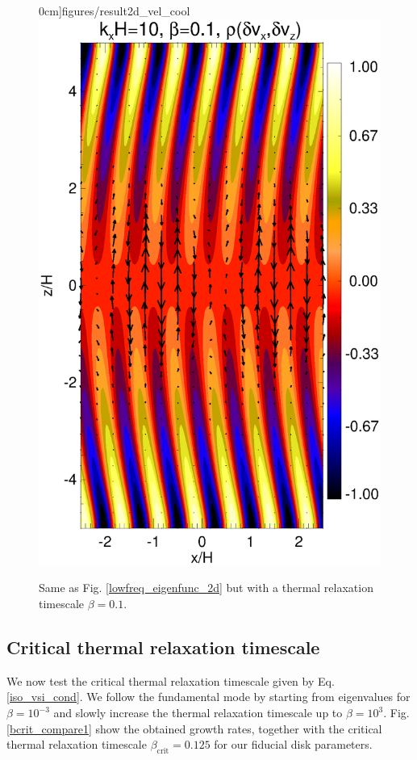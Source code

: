 \begin{figure}
  0cm]{figures/result2d_vel_cool}\includegraphics[scale=0.345,clip=true,trim=1.9cm 0cm 0cm
  0cm]{figures/result2d_mom_cool} 
  \caption{Same as  Fig. \ref{lowfreq_eigenfunc_2d} but with a thermal
    relaxation timescale $\beta=0.1$. 
    \label{lowfreq_eigenfunc_2d_cool}
  }
\end{figure}

\subsection{Critical thermal relaxation
  timescale}\label{bcrit_num_test}
We now test the critical thermal relaxation timescale given by
Eq. \ref{iso_vsi_cond}. We follow the fundamental mode by starting
from eigenvalues for $\beta=10^{-3}$ and slowly increase the thermal
relaxation timescale up to $\beta=10^3$. Fig. \ref{bcrit_compare1}
show the obtained growth rates, together with the critical 
thermal relaxation timescale $\beta_\mathrm{crit}=0.125$ for our
fiducial disk parameters.   

